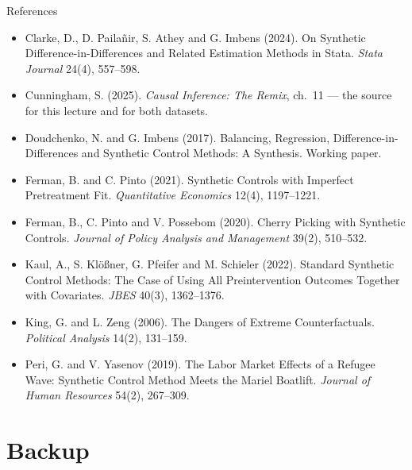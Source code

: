 \documentclass[
  11pt,
  ignorenonframetext,
  aspectratio=169,
]{beamer}
\begin{document}
\begin{frame}{References}
\begin{itemize}
  1549--1561.
\item
  Clarke, D., D. Pailañir, S. Athey and G. Imbens (2024). On Synthetic
  Difference-in-Differences and Related Estimation Methods in Stata.
  \emph{Stata Journal} 24(4), 557--598.
\item
  Cunningham, S. (2025). \emph{Causal Inference: The Remix}, ch.~11 ---
  the source for this lecture and for both datasets.
\item
  Doudchenko, N. and G. Imbens (2017). Balancing, Regression,
  Difference-in-Differences and Synthetic Control Methods: A Synthesis.
  Working paper.
\item
  Ferman, B. and C. Pinto (2021). Synthetic Controls with Imperfect
  Pretreatment Fit. \emph{Quantitative Economics} 12(4), 1197--1221.
\item
  Ferman, B., C. Pinto and V. Possebom (2020). Cherry Picking with
  Synthetic Controls. \emph{Journal of Policy Analysis and Management}
  39(2), 510--532.
\item
  Kaul, A., S. Klößner, G. Pfeifer and M. Schieler (2022). Standard
  Synthetic Control Methods: The Case of Using All Preintervention
  Outcomes Together with Covariates. \emph{JBES} 40(3), 1362--1376.
\item
  King, G. and L. Zeng (2006). The Dangers of Extreme Counterfactuals.
  \emph{Political Analysis} 14(2), 131--159.
\item
  Peri, G. and V. Yasenov (2019). The Labor Market Effects of a Refugee
  Wave: Synthetic Control Method Meets the Mariel Boatlift.
  \emph{Journal of Human Resources} 54(2), 267--309.
\end{itemize}
\end{frame}

\section{Backup}\label{backup}
\end{document}
